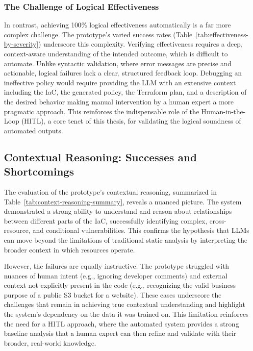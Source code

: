 \subsubsection{The Challenge of Logical Effectiveness}
In contrast, achieving 100\% logical effectiveness automatically is a far more complex challenge. The prototype's varied success rates (Table~\ref{tab:effectiveness-by-severity}) underscore this complexity. Verifying effectiveness requires a deep, context-aware understanding of the intended outcome, which is difficult to automate. Unlike syntactic validation, where error messages are precise and actionable, logical failures lack a clear, structured feedback loop. Debugging an ineffective policy would require providing the LLM with an extensive context including the IaC, the generated policy, the Terraform plan, and a description of the desired behavior making manual intervention by a human expert a more pragmatic approach. This reinforces the indispensable role of the Human-in-the-Loop (HITL), a core tenet of this thesis, for validating the logical soundness of automated outputs.

\subsection{Contextual Reasoning: Successes and Shortcomings}
The evaluation of the prototype's contextual reasoning, summarized in Table~\ref{tab:context-reasoning-summary}, reveals a nuanced picture. The system demonstrated a strong ability to understand and reason about relationships between different parts of the IaC, successfully identifying complex, cross-resource, and conditional vulnerabilities. This confirms the hypothesis that LLMs can move beyond the limitations of traditional static analysis by interpreting the broader context in which resources operate.

However, the failures are equally instructive. The prototype struggled with nuances of human intent (e.g., ignoring developer comments) and external context not explicitly present in the code (e.g., recognizing the valid business purpose of a public S3 bucket for a website). These cases underscore the challenges that remain in achieving true contextual understanding and highlight the system's dependency on the data it was trained on. This limitation reinforces the need for a HITL approach, where the automated system provides a strong baseline analysis that a human expert can then refine and validate with their broader, real-world knowledge.

